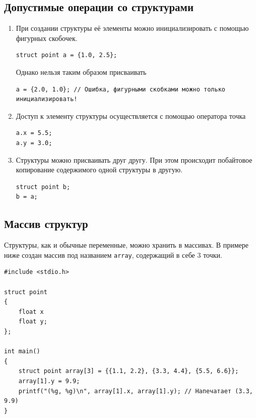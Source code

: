 \documentclass[10pt]{article}
\begin{document}
\subsection*{Допустимые операции со структурами}
\begin{enumerate}
\item При создании структуры её элементы можно инициализировать с помощью фигурных скобочек.
\begin{lstlisting}
struct point a = {1.0, 2.5};
\end{lstlisting}
Однако нельзя таким образом присваивать
\begin{lstlisting}
a = {2.0, 1.0}; // Ошибка, фигурными скобками можно только инициализировать!
\end{lstlisting}
\item Доступ к элементу структуры осуществляется с помощью оператора точка
\begin{lstlisting}
a.x = 5.5;
a.y = 3.0;
\end{lstlisting}
\item Структуры можно присваивать друг другу. При этом происходит побайтовое копирование содержимого одной структуры в другую.
\begin{lstlisting}
struct point b;
b = a;
\end{lstlisting}
\end{enumerate}

\subsection*{Массив структур}
Структуры, как и обычные переменные, можно хранить в массивах. В примере ниже создан массив под названием \texttt{array}, содержащий в себе 3 точки.
\begin{lstlisting}
#include <stdio.h>

struct point 
{
    float x
    float y;
};

int main() 
{
    struct point array[3] = {{1.1, 2.2}, {3.3, 4.4}, {5.5, 6.6}};
    array[1].y = 9.9;
    printf("(%g, %g)\n", array[1].x, array[1].y); // Напечатает (3.3, 9.9)
}
\end{lstlisting}
\end{document}
